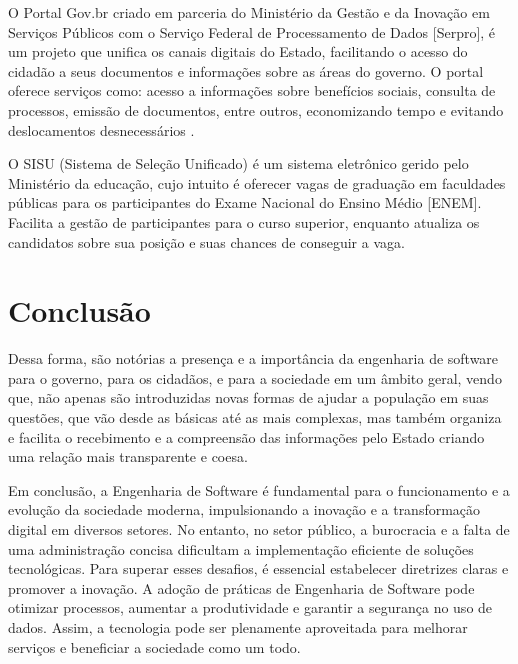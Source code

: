 \documentclass[12pt,oneside,a4paper,article]{abntex2}
\begin{document}
O Portal Gov.br criado em parceria do Ministério da Gestão e da Inovação em Serviços Públicos com o Serviço Federal de Processamento de Dados [Serpro], é um projeto que unifica os canais digitais do Estado, facilitando o acesso do cidadão a seus documentos e informações sobre as áreas do governo. O portal oferece serviços como: acesso a informações sobre benefícios sociais, consulta de processos, emissão de documentos, entre outros, economizando tempo e evitando deslocamentos desnecessários \cite{govbr}.

O SISU (Sistema de Seleção Unificado) é um sistema eletrônico gerido pelo Ministério da educação, cujo intuito é oferecer vagas de graduação em faculdades públicas para os participantes do Exame Nacional do Ensino Médio [ENEM]. Facilita a gestão de participantes para o curso superior, enquanto atualiza os candidatos sobre sua posição e suas chances de conseguir a vaga. \cite{sisuUFC2025}

\section{Conclusão}
Dessa forma, são notórias a presença e a importância da engenharia de software para o governo, para os cidadãos, e para a sociedade em um âmbito geral, vendo que, não apenas são introduzidas novas formas de ajudar a população em suas questões, que vão desde as básicas até as mais complexas, mas também organiza e facilita o recebimento e a compreensão das informações pelo Estado criando uma relação mais transparente e coesa. 

Em conclusão, a Engenharia de Software é fundamental para o funcionamento e a evolução da sociedade moderna, impulsionando a inovação e a transformação digital em diversos setores. No entanto, no setor público, a burocracia e a falta de uma administração concisa dificultam a implementação eficiente de soluções tecnológicas. Para superar esses desafios, é essencial estabelecer diretrizes claras e promover a inovação. A adoção de práticas de Engenharia de Software pode otimizar processos, aumentar a produtividade e garantir a segurança no uso de dados. Assim, a tecnologia pode ser plenamente aproveitada para melhorar serviços e beneficiar a sociedade como um todo.


\end{document}
